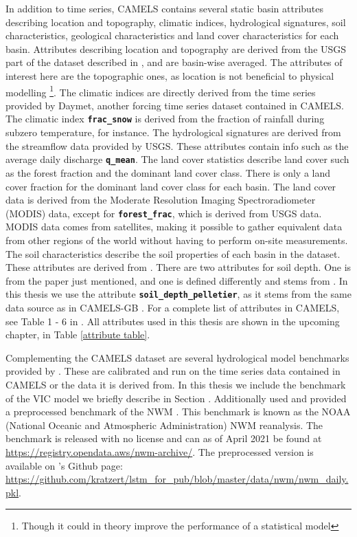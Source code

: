 In addition to time series, CAMELS contains several static basin attributes describing 
location and topography, climatic indices, hydrological signatures, soil characteristics, geological 
characteristics and land cover characteristics for each basin.
Attributes describing location and topography are derived from the USGS part of 
the dataset described in \citet{usgs_streamflow}, and are basin-wise averaged. 
The attributes of interest here are the topographic ones, as 
location is not beneficial to physical modelling \footnote{Though it could in theory 
improve the performance of a statistical model}.
The climatic indices are directly derived from the time series provided by Daymet, 
another forcing time series dataset contained in CAMELS. The climatic index
\textbf{\texttt{frac\_snow}} is derived from the fraction of rainfall during 
subzero temperature, for instance. 
The hydrological signatures are derived from the streamflow data provided by 
USGS. These attributes contain info such as the average daily discharge 
\textbf{\texttt{q\_mean}}.
The land cover statistics describe land cover such as the forest fraction and 
the dominant land cover class. There is only a land cover fraction for the dominant 
land cover class for each basin. The land cover data is derived from the 
Moderate Resolution Imaging Spectroradiometer (MODIS) data, 
except for \textbf{\texttt{forest\_frac}}, which is derived from USGS data. MODIS 
data comes from satellites, making it possible to gather equivalent data from 
other regions of the world without having to perform on-site measurements.
The soil characteristics describe the soil properties of each basin in the 
dataset. These attributes are derived from \citet{SoilData}. There are two 
attributes for soil depth. One is from the paper just mentioned, and one is defined 
differently and stems from \citet{pelletier}. In this thesis we use the attribute 
\textbf{\texttt{soil\_depth\_pelletier}}, as it stems from the same data source as 
in CAMELS-GB \citep{CAMELS_GB}. For a complete list of attributes in CAMELS, see 
Table 1 - 6 in \citet{CAMELS_US}. All attributes used in this thesis are shown in 
the upcoming chapter, in Table \ref{attribute table}.

Complementing the CAMELS dataset are several hydrological model benchmarks provided 
by \citet{CAMELS_hydroshare}. 
These are calibrated and run on the time series data contained in CAMELS or the data 
it is derived from. In this thesis we include the benchmark of the VIC model we 
briefly describe in Section \cite{VIC}. Additionally \citet{lstm_third_paper} used 
and provided a preprocessed  benchmark of the NWM \citep{NWMbench, NWMbench-paper}. 
This benchmark is known as the 
NOAA (National Oceanic and Atmospheric Administration) NWM reanalysis. The benchmark 
is released with no license and can as of April 2021  be found at 
\url{https://registry.opendata.aws/nwm-archive/}.
The preprocessed version is available on \citet{lstm_third_paper}'s 
Github page: \url{https://github.com/kratzert/lstm_for_pub/blob/master/data/nwm/nwm_daily.pkl}.

